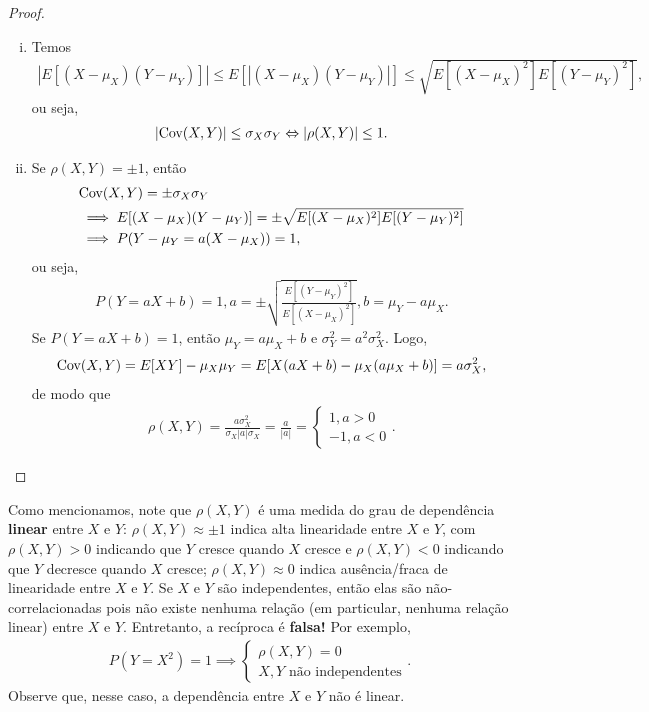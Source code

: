 \documentclass[../Notas.tex]{subfiles}
\begin{document}
\begin{proof}
\begin{enumerate}[(i)]
    \item Temos 
    \begin{align*}
        |E[(X-\mu_X)(Y-\mu_Y)]| \leq E[|(X-\mu_X)(Y-\mu_Y)|] \leq \sqrt{ E[(X-\mu_X)^2]E[(Y-\mu_Y)^2] },
    \end{align*}
    ou seja,
    \begin{align*}
        |\text{Cov}(X,Y)| \leq \sigma_X\sigma_Y \Leftrightarrow |\rho(X,Y)| \leq 1.
    \end{align*}
    \item Se $\rho(X,Y) = \pm 1$, então
    \begin{align*}
        &\text{Cov}(X,Y) = \pm\sigma_X\sigma_Y \\
        &\implies E[(X-\mu_X)(Y-\mu_Y)] = \pm\sqrt{ E[(X-\mu_X)^2]E[(Y-\mu_Y)^2] } \\
        &\implies P(Y - \mu_Y = a(X-\mu_X)) = 1,
    \end{align*}
    ou seja, 
    \begin{align*}
        P(Y = aX+b) = 1, a = \pm\sqrt{ \frac{ E[(Y-\mu_Y)^2] }{ E[(X-\mu_X)^2] } }, b = \mu_Y - a\mu_X.
    \end{align*}
    Se $P(Y = aX+b) = 1$, então $\mu_Y = a\mu_X + b$ e $\sigma_Y^2 = a^2\sigma_X^2$. Logo,
    \begin{align*}
        \text{Cov}(X,Y) = E[XY] - \mu_X\mu_Y = E[X(aX+b) - \mu_X(a\mu_X + b)] = a\sigma_X^2,
    \end{align*}
    de modo que
    \begin{align*}
        \rho(X,Y) = \frac{ a\sigma_X^2 }{ \sigma_X|a|\sigma_X } = \frac{a}{|a|} = \begin{cases}
        1, a>0 \\
        -1, a<0
        \end{cases}.
    \end{align*}
\end{enumerate}
\end{proof}

\begin{remark}
Como mencionamos, note que $\rho(X,Y)$ é uma medida do grau de dependência \textbf{linear} entre $X$ e $Y$: $\rho(X,Y)\approx\pm 1$ indica alta linearidade entre $X$ e $Y$, com $\rho(X,Y) > 0$ indicando que $Y$ cresce quando $X$ cresce e $\rho(X,Y) < 0$ indicando que $Y$ decresce quando $X$ cresce; $\rho(X,Y) \approx 0$ indica ausência/fraca de linearidade entre $X$ e $Y$. Se $X$ e $Y$ são independentes, então elas são não-correlacionadas pois não existe nenhuma relação (em particular, nenhuma relação linear) entre $X$ e $Y$. Entretanto, a recíproca é \textbf{falsa!} Por exemplo,
\begin{align*}
    P(Y=X^2) = 1 \implies \begin{cases}
    \rho(X,Y) = 0 \\
    X, Y \text{ não independentes}
    \end{cases}.
\end{align*}
Observe que, nesse caso, a dependência entre $X$ e $Y$ não é linear.
\end{remark}
\end{document}
